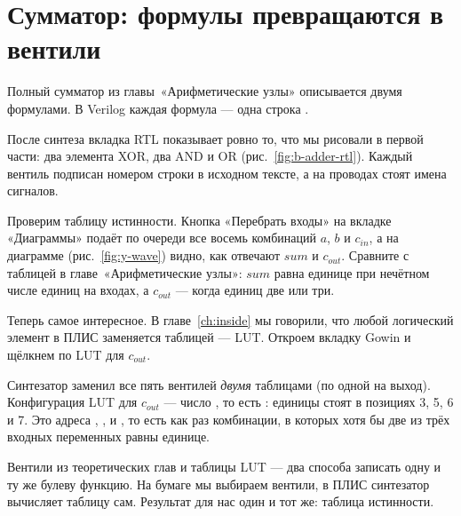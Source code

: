 \section{Сумматор: формулы превращаются в вентили}

Полный сумматор из главы~«Арифметические узлы» описывается двумя формулами.
В Verilog каждая формула --- одна строка .


После синтеза вкладка RTL показывает ровно то, что мы рисовали в первой
части: два элемента XOR, два AND и OR (рис.~\ref{fig:b-adder-rtl}). Каждый
вентиль подписан номером строки в исходном тексте, а на проводах стоят имена
сигналов.


Проверим таблицу истинности. Кнопка «Перебрать входы» на вкладке «Диаграммы»
подаёт по очереди все восемь комбинаций $a$, $b$ и $c_{in}$, а на
диаграмме (рис.~\ref{fig:y-wave}) видно, как отвечают $sum$ и $c_{out}$.
Сравните с таблицей в главе~«Арифметические узлы»: $sum$ равна единице при
нечётном числе единиц на входах, а $c_{out}$ --- когда единиц две или три.

Теперь самое интересное. В главе~\ref{ch:inside} мы говорили, что любой логический
элемент в ПЛИС заменяется таблицей --- LUT. Откроем вкладку Gowin и щёлкнем
по LUT для $c_{out}$.


Синтезатор заменил все пять вентилей \emph{двумя} таблицами (по одной на
выход). Конфигурация LUT для $c_{out}$ --- число , то есть
: единицы стоят в позициях 3, 5, 6 и 7. Это адреса
, ,  и , то есть как раз комбинации,
в которых хотя бы две из трёх входных переменных равны единице.

\begin{ideabox}
Вентили из теоретических глав и таблицы LUT --- два способа записать одну и ту же
булеву функцию. На бумаге мы выбираем вентили, в ПЛИС синтезатор вычисляет
таблицу сам. Результат для нас один и тот же: таблица истинности.
\end{ideabox}

